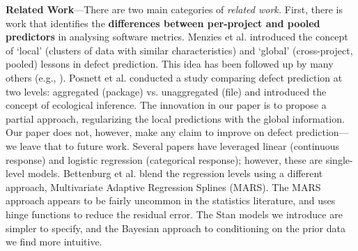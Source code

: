 \documentclass[sigconf,natbib=false]{acmart}
\begin{document}
\noindent\textbf{Related Work}---There are two main categories of \emph{related work.} %
First, there is work that identifies the \textbf{differences between per-project and pooled predictors} in analysing software metrics. Menzies et al. \cite{menzies11ase} introduced the concept of `local' (clusters of data with similar characteristics) and `global' (cross-project, pooled) lessons in defect prediction. This idea has been followed up by many others (e.g., \cite{Kamei2016,Bettenburg2012,panichella14}). Posnett et al. \cite{Posnett:2011} conducted a study comparing defect prediction at two levels: aggregated (package) vs. unaggregated (file) and introduced the concept of ecological inference. The innovation in our paper is to propose a partial approach, regularizing the local predictions with the global information. Our paper does not, however, make any claim to improve on defect prediction---we leave that to future work. Several papers \cite{Bettenburg2012,Zhou15regress} have leveraged linear (continuous response) and logistic regression (categorical response); however, these are single-level models. %
Bettenburg et al. \cite{Bettenburg2012} blend the regression levels using a different approach, Multivariate Adaptive Regression Splines (MARS). The MARS approach appears to be fairly uncommon in the statistics literature, and uses hinge functions to reduce the residual error. The Stan models we introduce are simpler to specify, and the Bayesian approach to conditioning on the prior data we find more intuitive.

\end{document}
